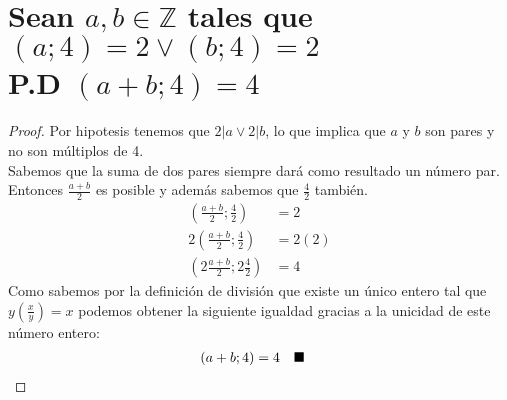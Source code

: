 \documentclass[12pt]{article}
\begin{document}
    \section{Sean $a, b \in \mathbb{Z}$ tales que $(a;4)=2 \vee (b;4)=2$ \\ P.D $(a+b;4)=4$}
        \begin{proof}
            Por hipotesis tenemos que $2|a \vee 2|b$, lo que implica que $a$ y $b$ son pares y no son múltiplos de 4. \\
            Sabemos que la suma de dos pares siempre dará como resultado un número par. \\
            Entonces $\frac{a+b}{2}$ es posible y además sabemos que $\frac{4}{2}$ también.
            \begin{align}
                \tag{Por definición de mcd} \left( \frac{a+b}{2};\frac{4}{2} \right) &= 2 \\
                \tag{Multiplicamos ambos lados por 2} 2 \left( \frac{a+b}{2};\frac{4}{2} \right) &= 2(2) \\
                \tag{Por demostración del ejercicio 11} \left( 2 \frac{a+b}{2};2 \frac{4}{2} \right) &= 4
            \end{align}
            Como sabemos por la definición de división que existe un único entero tal que $ y  \left( \frac{x}{y} \right) = x $ podemos obtener la siguiente igualdad gracias a la unicidad de este número entero:
            \begin{align}
                \notag (a+b;4) &= 4 \quad \blacksquare
            \end{align}
        \end{proof}
\end{document}
